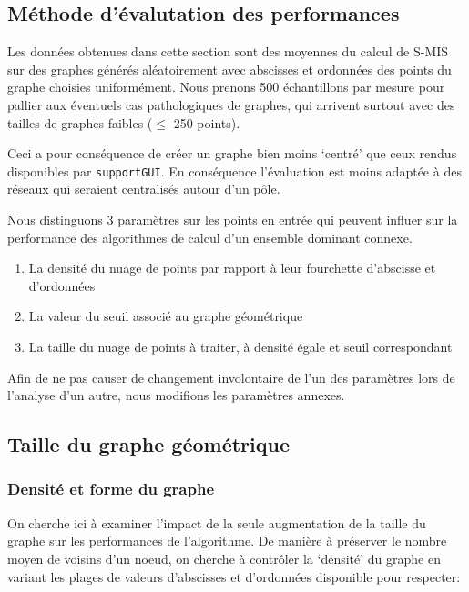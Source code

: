 \documentclass[]{report}
\providecommand{\tightlist}{%
  \setlength{\itemsep}{0pt}\setlength{\parskip}{0pt}}
\begin{document}
\subsection{Méthode d'évalutation des
performances}\label{muxe9thode-duxe9valutation-des-performances}

Les données obtenues dans cette section sont des moyennes du calcul de
S-MIS sur des graphes générés aléatoirement avec abscisses et ordonnées
des points du graphe choisies uniformément. Nous prenons 500
échantillons par mesure pour pallier aux éventuels cas pathologiques de
graphes, qui arrivent surtout avec des tailles de graphes faibles
(\(\leq\) 250 points).

Ceci a pour conséquence de créer un graphe bien moins `centré' que ceux
rendus disponibles par \lstinline!supportGUI!. En conséquence
l'évaluation est moins adaptée à des réseaux qui seraient centralisés
autour d'un pôle.

Nous distinguons 3 paramètres sur les points en entrée qui peuvent
influer sur la performance des algorithmes de calcul d'un ensemble
dominant connexe.

\begin{enumerate}
\def\labelenumi{\arabic{enumi}.}
\tightlist
\item
  La densité du nuage de points par rapport à leur fourchette d'abscisse
  et d'ordonnées
\item
  La valeur du seuil associé au graphe géométrique
\item
  La taille du nuage de points à traiter, à densité égale et seuil
  correspondant
\end{enumerate}

Afin de ne pas causer de changement involontaire de l'un des paramètres
lors de l'analyse d'un autre, nous modifions les paramètres annexes.

\subsection{Taille du graphe
géométrique}\label{taille-du-graphe-guxe9omuxe9trique}

\subsubsection{Densité et forme du
graphe}\label{densituxe9-et-forme-du-graphe}

On cherche ici à examiner l'impact de la seule augmentation de la taille
du graphe sur les performances de l'algorithme. De manière à préserver
le nombre moyen de voisins d'un noeud, on cherche à contrôler la
`densité' du graphe en variant les plages de valeurs d'abscisses et
d'ordonnées disponible pour respecter:
\end{document}

